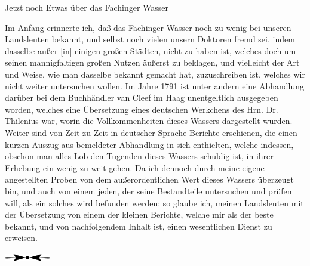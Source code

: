 \documentclass[11pt,a5paper,twoside]{memoir}
\begin{document}

\newpage

\begin{center}
\Large Jetzt noch Etwas über das Fachinger Wasser\par
\end{center}

Im Anfang erinnerte ich,
daß das Fachinger Wasser noch zu wenig bei unseren Landsleuten bekannt,
und selbst noch vielen unsern Doktoren fremd sei,
indem dasselbe außer [in] einigen großen Städten, nicht zu haben ist,
welches doch um seinen mannigfaltigen großen Nutzen äußerst zu beklagen,
und vielleicht der Art und Weise,
wie man dasselbe bekannt gemacht hat,
zuzuschreiben ist, welches wir nicht weiter untersuchen wollen.
Im Jahre 1791 ist unter andern eine Abhandlung darüber
bei dem Buchhändler van Cleef im Haag%
%
unentgeltlich ausgegeben worden,
welches eine Übersetzung eines deutschen Werkchens
des Hrn. Dr. Thilenius war,
worin die Vollkommenheiten dieses Wassers dargestellt wurden.
Weiter sind von Zeit zu Zeit in deutscher Sprache Berichte erschienen,
die einen kurzen Auszug aus bemeldeter Abhandlung in sich enthielten,
welche indessen,
obschon man alles Lob den Tugenden dieses Wassers schuldig ist,
in ihrer Erhebung ein wenig zu weit gehen.
Da ich dennoch durch meine eigene angestellten Proben
von dem außerordentlichen Wert dieses Wassers überzeugt bin,
und auch von einem jeden,
der seine Bestandteile untersuchen und prüfen will,
als ein solches wird befunden werden;
so glaube ich,
meinen Landsleuten mit der Übersetzung von einem der kleinen Berichte,
welche mir als der beste bekannt,
und von nachfolgendem Inhalt ist,
einen wesentlichen Dienst zu erweisen.

\vfill
\begin{center}
\includegraphics[width=2cm]{../figures/div1}
\end{center}
\vfill
\end{document}
